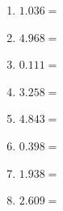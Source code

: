 \documentclass[12pt]{article}
\begin{document}
\begin{enumerate}
\item \large $ 1.036 = $ \vspace{1.5cm}
\item \large $ 4.968 = $ \vspace{1.5cm}
\item \large $ 0.111 = $ \vspace{1.5cm}
\item \large $ 3.258 = $ \vspace{1.5cm}
\item \large $ 4.843 = $ \vspace{1.5cm}
\item \large $ 0.398 = $ \vspace{1.5cm}
\item \large $ 1.938 = $ \vspace{1.5cm}
\item \large $ 2.609 = $ \vspace{1.5cm}
\end{enumerate}\newpage
\end{document}
